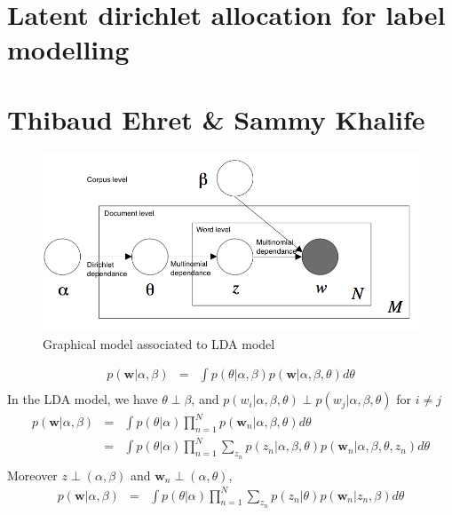 \documentclass[12pt]{article}
\begin{document}
\section*{Latent dirichlet allocation for label modelling}
\section*{Thibaud Ehret \& Sammy Khalife}
\begin{figure}[!h]
\centering
\captionsetup{justification=centering,margin=2cm}
\includegraphics[width=15cm]{LDA.png}
\caption{Graphical model associated to LDA model}
\end{figure}


\begin{eqnarray*}
p(\textbf{w}|\alpha, \beta) &  = & \int p(\theta | \alpha, \beta)p(\textbf{w} | \alpha, \beta, \theta)d\theta\\
\end{eqnarray*}
In the LDA model, we have $ \theta \perp \beta$, and $p(w_{i} | \alpha, \beta, \theta) \perp p(w_{j} | \alpha, \beta, \theta)$  for $ i \neq j $
\begin{eqnarray*}
p(\textbf{w}|\alpha, \beta) & = & \int p(\theta | \alpha) \prod_{n=1}^{N} p(\textbf{w}_{n} | \alpha, \beta, \theta)d\theta\\
& = & \int  p(\theta |\alpha) \prod_{n=1}^{N}  \sum_{z_{n}}p(z_{n}|\alpha, \beta, \theta)p(\textbf{w}_{n} | \alpha, \beta, \theta, z_{n}) d\theta\\
\end{eqnarray*}
Moreover $z \perp (\alpha,\beta)$ and $\textbf{w}_{n} \perp (\alpha,\theta)$,
\begin{eqnarray*}
p(\textbf{w}|\alpha, \beta) & = & \int p(\theta | \alpha)  \prod_{n=1}^{N}  \sum_{z_{n}}p(z_{n} |\theta)p(\textbf{w}_{n} | z_{n}, \beta) d\theta\\
\end{eqnarray*}
\end{document}
